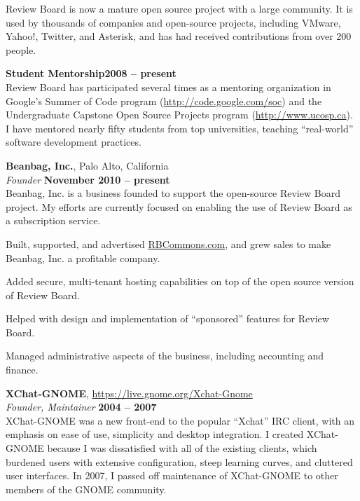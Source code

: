 \documentclass[margin,line]{resume}
\begin{document}
\begin{resume}
    Review Board is now a mature open source project with a large community. It
    is used by thousands of companies and open-source projects, including
    VMware, Yahoo!, Twitter, and Asterisk, and has had received contributions
    from over 200 people.

    {\bf Student Mentorship}\hfill{\bf 2008 -- present}\vspace{2mm}\\
    Review Board has participated several times as a mentoring organization in
    Google's Summer of Code program
    (\href{http://code.google.com/soc}{http://code.google.com/soc})
    and the Undergraduate Capstone Open Source Projects program
    (\href{http://www.ucosp.ca}{http://www.ucosp.ca}). I have mentored nearly
    fifty students from top universities, teaching ``real-world'' software
    development practices.

    \newpage

    {\bf Beanbag, Inc.}, Palo Alto, California \vspace{2mm}\\\vspace{1mm}%
    {\sl Founder} \hfill {\bf November 2010 -- present }\\
    Beanbag, Inc. is a business founded to support the open-source Review Board
    project. My efforts are currently focused on enabling the use of Review
    Board as a subscription service.
    \vspace{3mm}
    \begin{list2}
    \item Built, supported, and advertised \href{http://rbcommons.com}{RBCommons.com},
          and grew sales to make Beanbag, Inc. a profitable company.
    \item Added secure, multi-tenant hosting capabilities on top of the open
          source version of Review Board.
    \item Helped with design and implementation of ``sponsored'' features for
          Review Board.
    \item Managed administrative aspects of the business, including accounting
          and finance.
    \end{list2}

    {\bf XChat-GNOME}, \href{https://live.gnome.org/Xchat-Gnome}{https://live.gnome.org/Xchat-Gnome} \vspace{2mm}\\\vspace{1mm}%
    {\sl Founder, Maintainer} \hfill {\bf 2004 -- 2007}\\
    XChat-GNOME was a new front-end to the popular ``Xchat'' IRC client, with an
    emphasis on ease of use, simplicity and desktop integration. I created
    XChat-GNOME because I was dissatisfied with all of the existing clients,
    which burdened users with extensive configuration, steep learning curves,
    and cluttered user interfaces. In 2007, I passed off maintenance of
    XChat-GNOME to other members of the GNOME community.


\end{resume}
\end{document}
